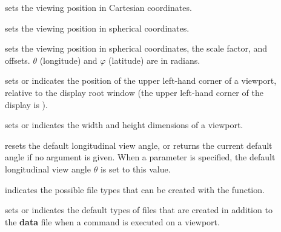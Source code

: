 \begin{description}
%
\item[]
sets the viewing position in Cartesian coordinates.

%
\item[]
sets the viewing position in spherical coordinates.

%
\item[]
sets the viewing position in spherical coordinates,
the scale factor, and offsets.
$\theta$ (longitude) and
$\varphi$ (latitude) are in radians.

%
\item[]
sets or indicates the position of the upper
left-hand corner of a \twodim{} viewport, relative to the display root
window (the upper left-hand corner of the display is \spad{[0, 0]}).

%
\item[]
sets or indicates the width and height dimensions
of a viewport.

%
\item[]
resets the default longitudinal view angle,
or returns the current default angle if no argument is given.
When a parameter is specified, the default longitudinal view angle
$\theta$ is set to this value.

%
\item[]\funArgs{\optArg{list\argDef{["pixmap",
"bitmap", "postscript", "image"}}}
indicates the possible file types
that can be created with the  function.

%
\item[]
sets or indicates the default types of files
that are created in addition to the {\bf data} file when a
 command
is executed on a viewport.


\end{description}
